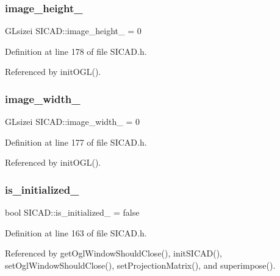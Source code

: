 \subsubsection{\texorpdfstring{image\+\_\+height\+\_\+}{image\_height\_}}
{\footnotesize\ttfamily G\+Lsizei S\+I\+C\+A\+D\+::image\+\_\+height\+\_\+ = 0\hspace{0.3cm}{\ttfamily [private]}}



Definition at line 178 of file S\+I\+C\+A\+D.\+h.



Referenced by init\+O\+G\+L().

\mbox{\label{classSICAD_ade37d5c3960d164acaa749745f55070f}} 
\subsubsection{\texorpdfstring{image\+\_\+width\+\_\+}{image\_width\_}}
{\footnotesize\ttfamily G\+Lsizei S\+I\+C\+A\+D\+::image\+\_\+width\+\_\+ = 0\hspace{0.3cm}{\ttfamily [private]}}



Definition at line 177 of file S\+I\+C\+A\+D.\+h.



Referenced by init\+O\+G\+L().

\mbox{\label{classSICAD_aa624c978497506de4a255c5f0301579f}} 
\subsubsection{\texorpdfstring{is\+\_\+initialized\+\_\+}{is\_initialized\_}}
{\footnotesize\ttfamily bool S\+I\+C\+A\+D\+::is\+\_\+initialized\+\_\+ = false\hspace{0.3cm}{\ttfamily [private]}}



Definition at line 163 of file S\+I\+C\+A\+D.\+h.



Referenced by get\+Ogl\+Window\+Should\+Close(), init\+S\+I\+C\+A\+D(), set\+Ogl\+Window\+Should\+Close(), set\+Projection\+Matrix(), and superimpose().

